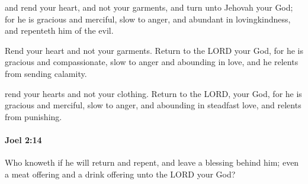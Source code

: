 			\begin{versebox}
					\item[BHS] 
					\item[LXX] 
					\item[ASV] and rend your heart, and not your garments, and turn unto Jehovah your God; for he is gracious and merciful, slow to anger, and abundant in lovingkindness, and repenteth him of the evil.
					\item[NIV] Rend your heart and not your garments. Return to the LORD your God, for he is gracious and compassionate, slow to anger and abounding in love, and he relents from sending calamity.
					\item[NRSV] rend your hearts and not your clothing. Return to the LORD, your God, for he is gracious and merciful, slow to anger, and abounding in steadfast love, and relents from punishing.
			\end{versebox}

		\paragraph{Joel 2:14} %
			\label{JOEL-2-14}

			Who knoweth if he will return and repent, and leave a blessing behind him; even a meat offering and a drink offering unto the LORD your God?

